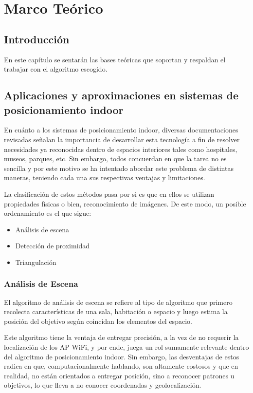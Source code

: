 \chapter{Marco Teórico}

\section{Introducción}

En este capítulo se sentarán las bases teóricas que soportan y respaldan el trabajar con el algoritmo escogido.

\section{Aplicaciones y aproximaciones en sistemas de posicionamiento indoor}

En cuánto a los sistemas de posicionamiento indoor, diversas documentaciones revisadas señalan la importancia de desarrollar esta tecnología a fin de resolver necesidades ya reconocidas dentro de espacios interiores tales como hospitales, museos, parques, etc. Sin embargo, todos concuerdan en que la tarea no es sencilla y por este motivo se ha intentado abordar este problema de distintas maneras, teniendo cada una sus respectivas ventajas y limitaciones.

La clasificación de estos métodos pasa por si es que en ellos se utilizan propiedades físicas o bien, reconocimiento de imágenes. De este modo, un posible ordenamiento es el que sigue:

\begin{itemize}
    \item{Análisis de escena}
    \item {Detección de proximidad}
    \item{Triangulación}
\end{itemize}

\subsection{Análisis de Escena}
El algoritmo de análisis de escena se refiere al tipo de algoritmo que primero recolecta características de una sala, habitación o espacio y luego estima la posición del objetivo según coincidan los elementos del espacio.

Este algoritmo tiene la ventaja de entregar precisión, a la vez de no requerir la localización de los AP WiFi, y por ende, juega un rol sumamente relevante dentro del algoritmo de posicionamiento indoor. Sin embargo, las desventajas de estos radica en que, computacionalmente hablando, son altamente costosos y que en realidad, no están orientados a entregar posición, sino a reconocer patrones u objetivos, lo que lleva a no conocer coordenadas y geolocalización.

